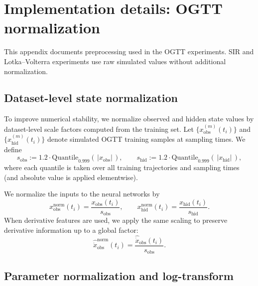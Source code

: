 \section{Implementation details: OGTT normalization}
\label{app:impl}

This appendix documents preprocessing used in the OGTT experiments.
SIR and Lotka--Volterra experiments use raw simulated values without additional normalization.

\subsection{Dataset-level state normalization}
\label{app:state-norm}

To improve numerical stability, we normalize observed and hidden state values by dataset-level scale factors computed from the training set.
Let $\{x_{\mathrm{obs}}^{(m)}(t_i)\}$ and $\{x_{\mathrm{hid}}^{(m)}(t_i)\}$ denote simulated OGTT training samples at sampling times.
We define
\begin{equation}
\label{eq:app-state-scales}
s_{\mathrm{obs}} := 1.2\cdot \mathrm{Quantile}_{0.999}\!\left(\,|x_{\mathrm{obs}}|\,\right),\qquad
s_{\mathrm{hid}} := 1.2\cdot \mathrm{Quantile}_{0.999}\!\left(\,|x_{\mathrm{hid}}|\,\right),
\end{equation}
where each quantile is taken over all training trajectories and sampling times (and absolute value is applied elementwise).

We normalize the inputs to the neural networks by
\begin{equation}
\label{eq:app-state-norm}
x_{\mathrm{obs}}^{\mathrm{norm}}(t_i)=\frac{x_{\mathrm{obs}}(t_i)}{s_{\mathrm{obs}}},\qquad
x_{\mathrm{hid}}^{\mathrm{norm}}(t_i)=\frac{x_{\mathrm{hid}}(t_i)}{s_{\mathrm{hid}}}.
\end{equation}
When derivative features are used, we apply the same scaling to preserve derivative information up to a global factor:
\begin{equation}
\label{eq:app-deriv-norm}
\widehat{\dot{x}}_{\mathrm{obs}}^{\mathrm{norm}}(t_i)=\frac{\widehat{\dot{x}}_{\mathrm{obs}}(t_i)}{s_{\mathrm{obs}}}.
\end{equation}

\subsection{Parameter normalization and log-transform}
\label{app:param-norm}

